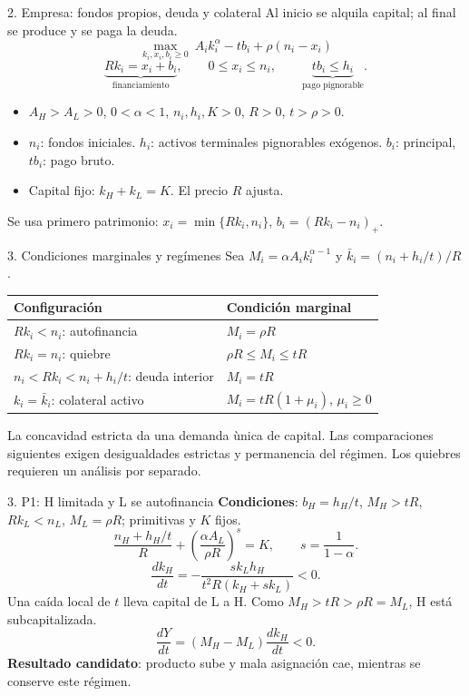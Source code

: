 \documentclass[aspectratio=169,11pt]{beamer}
\begin{document}
\begin{frame}{2. Empresa: fondos propios, deuda y colateral}
Al inicio se alquila capital; al final se produce y se paga la deuda.
\[
 \max_{k_i,x_i,b_i\geq0}\ A_i k_i^\alpha-tb_i+\rho(n_i-x_i)
\]
\[
 \underbrace{Rk_i=x_i+b_i}_{\text{financiamiento}},\qquad
 0\leq x_i\leq n_i,\qquad
 \underbrace{tb_i\leq h_i}_{\text{pago pignorable}}.
\]
\begin{itemize}
 \item $A_H>A_L>0$, $0<\alpha<1$, $n_i,h_i,K>0$, $R>0$, $t>\rho>0$.
 \item $n_i$: fondos iniciales. $h_i$: activos terminales pignorables
 ex\'ogenos. $b_i$: principal, $tb_i$: pago bruto.
 \item Capital fijo: $k_H+k_L=K$. El precio $R$ ajusta.
\end{itemize}
\medskip
Se usa primero patrimonio: $x_i=\min\{Rk_i,n_i\}$,
$b_i=(Rk_i-n_i)_+$.
\end{frame}

\begin{frame}{3. Condiciones marginales y reg\'imenes}
Sea $M_i=\alpha A_i k_i^{\alpha-1}$ y
$\bar k_i=(n_i+h_i/t)/R$.
\medskip

\begin{tabular}{@{}ll@{}}
\toprule
Configuraci\'on & Condici\'on marginal \\
\midrule
$Rk_i<n_i$: autofinancia & $M_i=\rho R$ \\
$Rk_i=n_i$: quiebre & $\rho R\leq M_i\leq tR$ \\
$n_i<Rk_i<n_i+h_i/t$: deuda interior & $M_i=tR$ \\
$k_i=\bar k_i$: colateral activo & $M_i=tR(1+\mu_i)$, $\mu_i\geq0$ \\
\bottomrule
\end{tabular}
\medskip

La concavidad estricta da una demanda \`unica de capital.
Las comparaciones siguientes exigen desigualdades estrictas y permanencia
del r\'egimen. Los quiebres requieren un an\'alisis por separado.
\end{frame}

\begin{frame}{3. P1: H limitada y L se autofinancia}
\textbf{Condiciones}: $b_H=h_H/t$, $M_H>tR$, $Rk_L<n_L$,
$M_L=\rho R$; primitivas y $K$ fijos.
\[
 \frac{n_H+h_H/t}{R}+\left(\frac{\alpha A_L}{\rho R}\right)^s=K,
 \qquad s=\frac1{1-\alpha}.
\]
\[
 \frac{dk_H}{dt}=-\frac{sk_Lh_H}{t^2R(k_H+sk_L)}<0.
\]
Una ca\'ida local de $t$ lleva capital de L a H.
Como $M_H>tR>\rho R=M_L$, H est\'a subcapitalizada.
\[
 \frac{dY}{dt}=(M_H-M_L)\frac{dk_H}{dt}<0.
\]
\textbf{Resultado candidato}: producto sube y mala asignaci\'on cae,
mientras se conserve este r\'egimen.
\end{frame}
\end{document}

